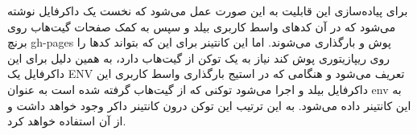 برای پیاده‌سازی این قابلیت به این صورت عمل می‌شود که نخست یک داکرفایل نوشته می‌شود که در آن کدهای واسط کاربری بیلد و سپس به کمک صفحات گیت‌هاب روی برنچ gh-pages پوش و بارگذاری می‌شوند. اما این کانتینر برای این که بتواند کدها را روی ریپازیتوری پوش کند نیاز به یک توکن از گیت‌هاب دارد، به همین دلیل برای این داکرفایل یک ENV تعریف می‌شود و هنگامی که در استیج بارگذاری واسط کاربری این داکرفایل بیلد و اجرا می‌شود توکنی که از گیت‌هاب گرفته شده است به عنوان env به این کانتینر داده می‌شود. به این ترتیب این توکن درون کانتینر داکر وجود خواهد داشت و
از آن استفاده خواهد کرد.

